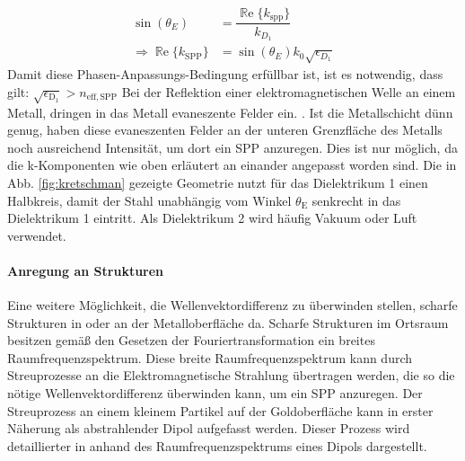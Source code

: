 \documentclass[titlepage]{article}
\renewcommand{\Re}{\operatorname{\mathbb{R}e}}
\begin{document}
			\begin{align}
				\label{eq:phase_condition_kretschmann}
				\sin(\theta_E) &= \dfrac{\Re\{k_{\mathrm{spp}}\}}{k_{D_1}}\\
				\Rightarrow \Re\{k_{\mathrm{SPP}}\} &= \sin(\theta_E) k_0 \sqrt{\epsilon_{D_1}}
			\end{align}
			Damit diese Phasen-Anpassungs-Bedingung erfüllbar ist, ist es notwendig, dass gilt: $\sqrt{\epsilon_\mathrm{D_1}} > n_\mathrm{eff, SPP}$
			Bei der Reflektion einer elektromagnetischen Welle an einem Metall, dringen in das Metall evaneszente Felder ein. \cite{Novotny.2012b}. Ist die Metallschicht dünn genug, haben diese evaneszenten Felder an der unteren Grenzfläche des Metalls noch ausreichend Intensität, um dort ein SPP anzuregen. Dies ist nur möglich, da die k-Komponenten wie oben erläutert an einander angepasst worden sind. Die in Abb. \ref{fig:kretschman} gezeigte Geometrie nutzt für das Dielektrikum 1 einen Halbkreis, damit der Stahl unabhängig vom Winkel $\theta_\mathrm{E}$ senkrecht in das Dielektrikum 1 eintritt. Als Dielektrikum 2 wird häufig Vakuum oder Luft verwendet.			
		
			\paragraph{Anregung an Strukturen}
			Eine weitere Möglichkeit, die Wellenvektordifferenz zu überwinden stellen, scharfe Strukturen in oder an der Metalloberfläche da. Scharfe Strukturen im Ortsraum besitzen gemäß den Gesetzen der Fouriertransformation ein breites Raumfrequenzspektrum. Diese breite Raumfrequenzspektrum kann durch Streuprozesse an die Elektromagnetische Strahlung übertragen werden, die so die nötige Wellenvektordifferenz überwinden kann, um ein SPP anzuregen. Der Streuprozess an einem kleinem Partikel auf der Goldoberfläche kann in erster Näherung als abstrahlender Dipol aufgefasst werden. Dieser Prozess wird detaillierter in  anhand des Raumfrequenzspektrums eines Dipols dargestellt.
\end{document}
